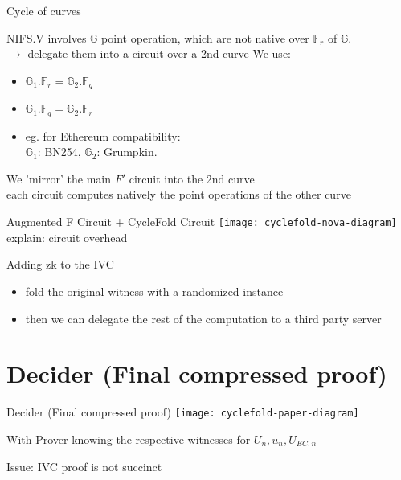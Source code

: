 \documentclass[t]{beamer}
\begin{document}
\begin{frame}{Cycle of curves}
  \small{
    NIFS.V involves $\mathbb{G}$ point operation, which are not native over $\mathbb{F}_r$ of $\mathbb{G}$.
  \\$\longrightarrow$ delegate them into a circuit over a 2nd curve 
  We use:
  \begin{itemize}
    \item $\mathbb{G}_1.\mathbb{F}_r = \mathbb{G}_2.\mathbb{F}_q$
    \item $\mathbb{G}_1.\mathbb{F}_q = \mathbb{G}_2.\mathbb{F}_r$
    \item eg. for Ethereum compatibility:\\
      $\mathbb{G}_1$: BN254, $\mathbb{G}_2$: Grumpkin.
  \end{itemize}

  \vspace{0.3cm}

  We 'mirror' the main $F'$ circuit into the 2nd curve\\
  each circuit computes natively the point operations of the other curve
  }

\end{frame}


\begin{frame}{Augmented F Circuit + CycleFold Circuit}
  \texttt{[image: cyclefold-nova-diagram]}
  explain: circuit overhead
\end{frame}

\begin{frame}{Adding zk to the IVC}
  \begin{itemize}
    \item fold the original witness with a randomized instance
    \item then we can delegate the rest of the computation to a third party server
  \end{itemize}
\end{frame}

\section{Decider (Final compressed proof)}

\begin{frame}{Decider (Final compressed proof)}
  \texttt{[image: cyclefold-paper-diagram]}

  With Prover knowing the respective witnesses for $U_n, u_n, U_{EC,n}$

  \vspace{1cm}

  Issue: IVC proof is not succinct
\end{frame}
\end{document}
